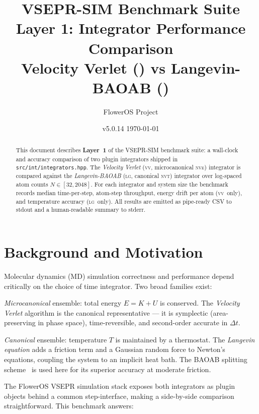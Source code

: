 \documentclass[11pt,a4paper]{article}
\title{%
  \textbf{VSEPR-SIM Benchmark Suite} \\[4pt]
  \Large Layer 1: Integrator Performance Comparison \\[14pt]
  \normalsize Velocity Verlet (\NVE) \quad vs \quad Langevin-BAOAB (\NVT)%
}
\author{FlowerOS Project}
\date{v5.0.14 \quad \today}
\theoremstyle{definition}
\theoremstyle{plain}
\newcommand{\VV}{\textsc{vv}}
\newcommand{\LG}{\textsc{lg}}
\newcommand{\NVE}{\textsc{nve}}
\newcommand{\NVT}{\textsc{nvt}}
\newcommand{\dt}{\Delta t}
\begin{document}
\maketitle
\thispagestyle{empty}

\begin{abstract}
This document describes \textbf{Layer~1} of the VSEPR-SIM benchmark suite:
a wall-clock and accuracy comparison of two plugin integrators shipped in
\texttt{src/int/integrators.hpp}.
The \emph{Velocity Verlet} (\VV, microcanonical \NVE) integrator is compared
against the \emph{Langevin-BAOAB} (\LG, canonical \NVT) integrator over
log-spaced atom counts $N \in [32, 2048]$.
For each integrator and system size the benchmark records median time-per-step,
atom-step throughput, energy drift per atom (\VV\ only), and temperature
accuracy (\LG\ only).
All results are emitted as pipe-ready CSV to stdout and a human-readable
summary to stderr.
\end{abstract}

\tableofcontents
\newpage

\section{Background and Motivation}
\label{sec:background}

Molecular dynamics (MD) simulation correctness and performance depend
critically on the choice of time integrator.  Two broad families exist:

\begin{description}[leftmargin=3em,labelwidth=2.5em]
  \item[\NVE] \emph{Microcanonical} ensemble: total energy $E = K + U$ is
	conserved.  The \emph{Velocity Verlet} algorithm is the canonical
	representative — it is symplectic (area-preserving in phase space),
	time-reversible, and second-order accurate in $\dt$.

  \item[\NVT] \emph{Canonical} ensemble: temperature $T$ is maintained by a
	thermostat.  The \emph{Langevin equation} adds a friction term and a
	Gaussian random force to Newton's equations, coupling the system to an
	implicit heat bath.  The BAOAB splitting scheme~\cite{baoab2012} is used
	here for its superior accuracy at moderate friction.
\end{description}

The FlowerOS VSEPR simulation stack exposes both integrators as plugin
objects behind a common step-interface, making a side-by-side comparison
straightforward.  This benchmark answers:
\end{document}
